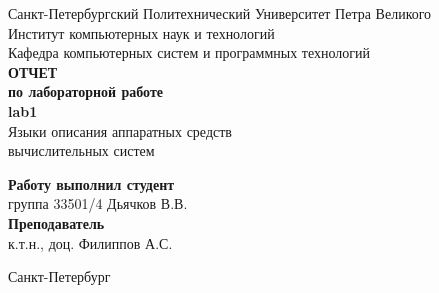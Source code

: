 \begin{titlepage}
\begin{center}
	Санкт-Петербургский Политехнический Университет Петра Великого\\[0.3cm]
	Институт компьютерных наук и технологий \\[0.3cm]
	Кафедра компьютерных систем и программных технологий\\[4cm]
	
	\textbf{ОТЧЕТ}\\ 
	\textbf{по лабораторной работе}\\[0.5cm]
	\textbf{lab1}\\[0.1cm]
	Языки описания аппаратных средств\\ вычислительных систем\\[4.0cm]
\end{center}

\begin{flushright}
	\begin{minipage}{0.45\textwidth}
		\textbf{Работу выполнил студент}\\[3mm]
		группа 33501/4 \hspace*{9mm} Дьячков В.В.\\[5mm]
		\textbf{Преподаватель}\\[5mm]
		\sign[1.5cm] \hspace*{1mm} к.т.н., доц. Филиппов А.С. \\[5mm]
	\end{minipage}
\end{flushright}

\vfill

\begin{center}
	Санкт-Петербург\\
	\the\year
\end{center}
\end{titlepage}

\addtocounter{page}{1}